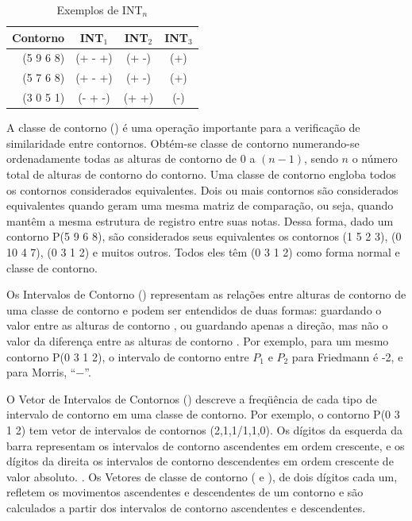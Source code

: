\begin{table}
  \centering
  \begin{tabular}{r|ccc}
    Contorno & INT$_1$ & INT$_2$ & INT$_3$ \\
    \hline
    (5 9 6 8) & (+ - +) & (+ -) & (+) \\
    (5 7 6 8) & (+ - +) & (+ -) & (+) \\
    (3 0 5 1) & (- + -) & (+ +) & (-)
  \end{tabular}
  \caption{Exemplos de INT$_n$}
  \label{tab:int-contornos}
\end{table}

A classe de contorno () é uma operação importante para a
verificação de similaridade entre contornos. Obtém-se classe de
contorno numerando-se ordenadamente todas as alturas de contorno de
$0$ a $(n-1)$, sendo $n$ o número total de alturas de contorno do
contorno. Uma classe de contorno engloba todos os contornos
considerados equivalentes. Dois ou mais contornos são considerados
equivalentes quando geram uma mesma matriz de comparação, ou seja,
quando mantêm a mesma estrutura de registro entre suas notas. Dessa
forma, dado um contorno P(5 9 6 8), são considerados seus equivalentes
os contornos (1 5 2 3), (0 10 4 7), (0 3 1 2) e muitos outros. Todos
eles têm (0 3 1 2) como forma normal e classe de contorno.

Os Intervalos de Contorno () representam as relações entre
alturas de contorno de uma classe de contorno e podem ser entendidos
de duas formas: guardando o valor entre as alturas de contorno
\cite{friedmann85:methodology}, ou guardando apenas a direção, mas não
o valor da diferença entre as alturas de contorno
\cite{morris93:directions}. Por exemplo, para um mesmo contorno P(0 3
1 2), o intervalo de contorno entre $P_1$ e $P_2$ para Friedmann é -2,
e para Morris, ``$-$''.

O Vetor de Intervalos de Contornos () descreve a freqüência de
cada tipo de intervalo de contorno em uma classe de contorno. Por
exemplo, o contorno P(0 3 1 2) tem vetor de intervalos de contornos
(2,1,1/1,1,0). Os dígitos da esquerda da barra representam os
intervalos de contorno ascendentes em ordem crescente, e os dígitos da
direita os intervalos de contorno descendentes em ordem crescente de
valor absoluto. \cite{friedmann85:methodology}. Os Vetores de classe
de contorno ( e ), de dois dígitos cada um,
refletem os movimentos ascendentes e descendentes de um contorno e são
calculados a partir dos intervalos de contorno ascendentes e
descendentes.

